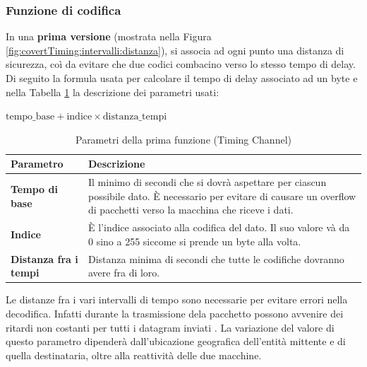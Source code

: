 \subsubsection{Funzione di codifica} 
In una \textbf{prima versione} (mostrata nella Figura \ref{fig:covertTiming:intervalli:distanza}), 
si associa ad ogni punto una distanza di sicurezza, coì da evitare che due 
codici combacino verso lo stesso tempo di delay. 
Di seguito la formula usata per calcolare il tempo di delay associato ad un 
byte e nella Tabella \ref{tabella:timingCC:parametri:funzione1} la descrizione dei parametri usati:
\begin{center}
$\text{tempo\_base}+\text{indice}\times\text{distanza\_tempi}$
\end{center} 
\begin{minipage}{\textwidth}
\centering
\begin{longtable}{|p{}|p{}|} 
\caption{Parametri della prima funzione (Timing Channel)} 
\label{tabella:timingCC:parametri:funzione1} \\
    \hline
    \textbf{Parametro} & \textbf{Descrizione} \\
    \hline
    \textbf{Tempo di base} &  
    Il minimo di secondi che si dovrà aspettare per ciascun possibile dato. 
    \uppercase{è} necessario per evitare di causare un overflow di pacchetti verso la macchina che riceve i dati.
    \\
    \hline 
    \textbf{Indice} & 
    \uppercase{è} l'indice associato alla codifica del dato. 
    Il suo valore và da 0 sino a 255 siccome si prende un byte alla volta. 
    \\ 
    \hline 
    \textbf{Distanza fra i tempi} & 
    Distanza minima di secondi che tutte le codifiche dovranno avere fra di loro. 
\\
\hline
\end{longtable} 
\end{minipage} 
\vspace{1ex} \newline
Le distanze fra i vari intervalli di tempo sono necessarie per evitare 
errori nella decodifica. 
Infatti durante la trasmissione dela pacchetto possono avvenire dei 
ritardi non costanti per tutti i datagram inviati \cite{packet_delay1}\cite{packet_delay2}. 
La variazione del valore di questo parametro dipenderà dall'ubicazione geografica dell'entità mittente 
e di quella destinataria, oltre alla reattività delle due macchine.
\vspace{1ex} \newline 
